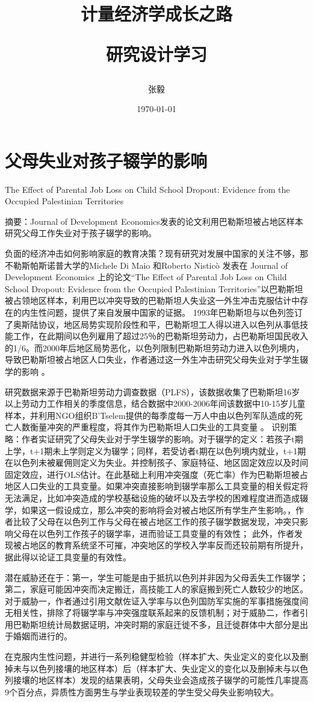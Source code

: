 \documentclass{article}
\title{计量经济学成长之路
\\[2ex]
\begin{large}
研究设计学习
\end{large}}
\author{张毅}
\date{\today}
\begin{document}
\maketitle

\newpage
\section{父母失业对孩子辍学的影响}
The Effect of Parental Job Loss on Child School Dropout: Evidence from the Occupied Palestinian Territories
\par 摘要：Journal of Development Economics发表的论文利用巴勒斯坦被占地区样本研究父母工作失业对于孩子辍学的影响\citep{di_maio_2019}。
\par 负面的经济冲击如何影响家庭的教育决策？现有研究对发展中国家的关注不够，那不勒斯帕斯诺普大学的Michele Di Maio 和Roberto Nisticò 发表在 Journal of Development Economics 上的论文“The Effect of Parental Job Loss on Child School Dropout: Evidence from the Occupied Palestinian Territories”以巴勒斯坦被占领地区样本，利用巴以冲突导致的巴勒斯坦人失业这一外生冲击克服估计中存在的内生性问题，提供了来自发展中国家的证据。
1993年巴勒斯坦与以色列签订了奥斯陆协议，地区局势实现阶段性和平，巴勒斯坦工人得以进入以色列从事低技能工作，在此期间以色列雇用了超过25％的巴勒斯坦劳动力，占巴勒斯坦国民收入的1/6。而2000年后地区局势恶化，以色列限制巴勒斯坦劳动力进入以色列境内，导致巴勒斯坦被占地区人口失业，作者通过这一外生冲击研究父母失业对于学生辍学的影响 。
\par 研究数据来源于巴勒斯坦劳动力调查数据（PLFS），该数据收集了巴勒斯坦16岁以上劳动力工作相关的季度信息，结合数据中2000-2006年间该数据中10-15岁儿童样本，并利用NGO组织B’Tselem提供的每季度每一万人中由以色列军队造成的死亡人数衡量冲突的严重程度，将其作为巴勒斯坦人口失业的工具变量 。
识别策略：作者实证研究了父母失业对于学生辍学的影响。对于辍学的定义：若孩子t期上学，t+1期未上学则定义为辍学；同样，若受访者t期在以色列境内就业，t+1期在以色列未被雇佣则定义为失业。并控制孩子、家庭特征、地区固定效应以及时间固定效应，进行OLS估计。在此基础上利用冲突强度（死亡率）作为巴勒斯坦被占地区人口失业的工具变量。如果冲突直接影响到辍学率那么工具变量的相关假定将无法满足，比如冲突造成的学校基础设施的破坏以及去学校的困难程度进而造成辍学，如果这一假设成立，那么冲突的影响将会对被占地区所有学生产生影响。，作者比较了父母在以色列工作与父母在被占地区工作的孩子辍学数据发现，冲突只影响父母在以色列工作孩子的辍学率，进而验证工具变量的有效性； 此外，作者发现被占地区的教育系统坚不可摧，冲突地区的学校入学率反而还较前期有所提升，据此得以论证工具变量的有效性。
\par 潜在威胁还在于：第一，学生可能是由于抵抗以色列并非因为父母丢失工作辍学；第二，家庭可能因冲突而决定搬迁，高技能工人的家庭搬到死亡人数较少的地区。对于威胁一，作者通过引用文献佐证入学率与以色列国防军实施的军事措施强度间无相关性，排除了将辍学率与冲突强度联系起来的反馈机制；对于威胁二，作者引用巴勒斯坦统计局数据证明，冲突时期的家庭迁徙不多，且迁徙群体中大部分是出于婚姻而进行的。
\par 在克服内生性问题，并进行一系列稳健型检验（样本扩大、失业定义的变化以及删掉未与以色列接壤的地区样本）后（样本扩大、失业定义的变化以及删掉未与以色列接壤的地区样本）发现的结果表明，父母失业会造成孩子辍学的可能性几率提高9个百分点，异质性方面男生与学业表现较差的学生受父母失业影响较大。
\end{document}
